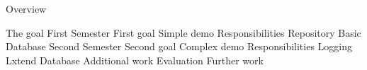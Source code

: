 \begin{frame}{Overview}
\begin{outline}	
\1 The goal
 \1 First Semester
     \2 First goal
     \2 Simple demo
     \2 Responsibilities
     \2 Repository
     \2 Basic Database
  \1 Second Semester 
     \2 Second goal
     \2 Complex demo
     \2 Responsibilities
     \2 Logging
     \2 Lxtend Database
     \2 Additional work
\1 Evaluation
\1 Further work    
\end{outline}	
\end{frame}